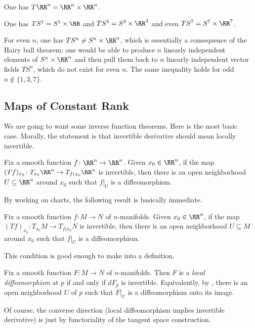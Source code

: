 \documentclass[../notes.tex]{subfiles}
\begin{document}
\begin{example}
	One has $T\RR^n=\RR^n\times\RR^n$.
\end{example}
\begin{example}
	One has $TS^1=S^1\times\RR$ and $TS^3=S^3\times\RR^3$ and even $TS^7=S^7\times\RR^7$.
\end{example}
\begin{example}
	For even $n$, one has $TS^n\ne S^n\times\RR^n$, which is essentially a consequence of the Hairy ball theorem: one would be able to produce $n$ linearly independent elements of $S^n\times\RR^n$ and then pull them back to $n$ linearly independent vector fields $TS^n$, which do not exist for even $n$. The same inequality holds for odd $n\notin\{1,3,7\}$.
\end{example}

\subsection{Maps of Constant Rank}
We are going to want some inverse function theorems. Here is the most basic case. Morally, the statement is that invertible derivative should mean locally invertible.
\begin{theorem}
	Fix a smooth function $f\colon\RR^n\to\RR^n$. Given $x_0\in\RR^n$, if the map $(Tf)_{x_0}\colon T_{x_0}\RR^n\to T_{f(x_0}\RR^n$ is invertible, then there is an open neighborhood $U\subseteq\RR^n$ around $x_0$ such that $f|_U$ is a diffeomorphism.
\end{theorem}
By working on charts, the following result is basically immediate.
\begin{theorem} \label{thm:inv-func}
	Fix a smooth function $f\colon M\to N$ of $n$-manifolds. Given $x_0\in\RR^n$, if the map $(Tf)_{x_0}\colon T_{x_0}M\to T_{f(x_0}N$ is invertible, then there is an open neighborhood $U\subseteq M$ around $x_0$ such that $f|_U$ is a diffeomorphism.
\end{theorem}
This condition is good enough to make into a definition.
\begin{definition}
	Fix a smooth function $F\colon M\to N$ of $n$-manifolds. Then $F$ is a \textit{local diffeomorphism} at $p$ if and only if $dF_p$ is invertible. Equivalently, by , there is an open neighborhood $U$ of $p$ such that $F|_U$ is a diffeomorphism onto its image.
\end{definition}
\begin{remark}
	Of course, the converse direction (local diffeomorphism implies invertible derivative) is just by functoriality of the tangent space construction.
\end{remark}
\end{document}
